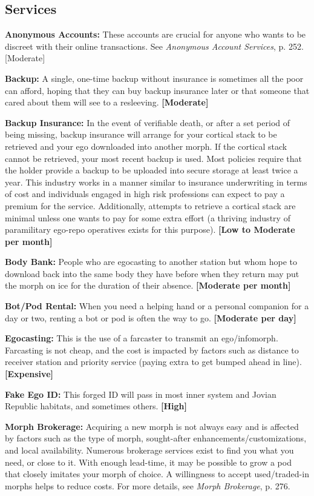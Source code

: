 \subsection{Services}
\label{sec:services}

\textbf{Anonymous Accounts:} These accounts are crucial for anyone who wants to be discreet with their online transactions. See \emph{Anonymous Account Services}, p. 252. [Moderate]

\textbf{Backup:} A single, one-time backup without insurance is sometimes all the poor can afford, hoping that they can buy backup insurance later or that someone that cared about them will see to a resleeving. \textbf{[Moderate]}

\textbf{Backup Insurance:} In the event of verifiable death, or after a set period of being missing, backup insurance will arrange for your cortical stack to be retrieved and your ego downloaded into another morph. If the cortical stack cannot be retrieved, your most recent backup is used. Most policies require that the holder provide a backup to be uploaded into secure storage at least twice a year. This industry works in a manner similar to insurance underwriting in terms of cost and individuals engaged in high risk professions can expect to pay a premium for the service. Additionally, attempts to retrieve a cortical stack are minimal unless one wants to pay for some extra effort (a thriving industry of paramilitary ego-repo operatives exists for this purpose). \textbf{[Low to Moderate per month]}

\textbf{Body Bank:} People who are egocasting to another station but whom hope to download back into the same body they have before when they return may put the morph on ice for the duration of their absence. \textbf{[Moderate per month]}

\textbf{Bot/Pod Rental:} When you need a helping hand or a personal companion for a day or two, renting a bot or pod is often the way to go. \textbf{[Moderate per day]}

\textbf{Egocasting:} This is the use of a farcaster to transmit an ego/infomorph. Farcasting is not cheap, and the cost is impacted by factors such as distance to receiver station and priority service (paying extra to get bumped ahead in line). \textbf{[Expensive]}

\textbf{Fake Ego ID:} This forged ID will pass in most inner system and Jovian Republic habitats, and sometimes others. \textbf{[High]}

\textbf{Morph Brokerage:} Acquiring a new morph is not always easy and is affected by factors such as the type of morph, sought-after enhancements/customizations, and local availability. Numerous brokerage services exist to find you what you need, or close to it. With enough lead-time, it may be possible to grow a pod that closely imitates your morph of choice. A willingness to accept used/traded-in morphs helps to reduce costs. For more details, see \emph{Morph Brokerage}, p. 276.

